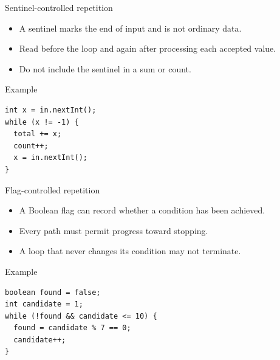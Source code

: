\documentclass[10pt,aspectratio=169]{beamer}
\begin{document}
\begin{frame}[fragile,t]{Sentinel-controlled repetition}
\begin{itemize}
\item A sentinel marks the end of input and is not ordinary data.
\item Read before the loop and again after processing each accepted value.
\item Do not include the sentinel in a sum or count.
\end{itemize}
\vspace{1mm}\begin{block}{Example}
\begin{lstlisting}
int x = in.nextInt();
while (x != -1) {
  total += x;
  count++;
  x = in.nextInt();
}
\end{lstlisting}
\end{block}
\end{frame}

\begin{frame}[fragile,t]{Flag-controlled repetition}
\begin{itemize}
\item A Boolean flag can record whether a condition has been achieved.
\item Every path must permit progress toward stopping.
\item A loop that never changes its condition may not terminate.
\end{itemize}
\vspace{1mm}\begin{block}{Example}
\begin{lstlisting}
boolean found = false;
int candidate = 1;
while (!found && candidate <= 10) {
  found = candidate % 7 == 0;
  candidate++;
}
\end{lstlisting}
\end{block}
\end{frame}
\end{document}
